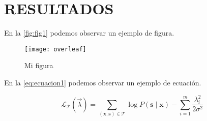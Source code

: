 \chapter{RESULTADOS}

\lipsum[1-1] \parencite{texbook}

En la \autoref{fig:fig1} podemos observar un ejemplo de figura.

\begin{figure}[H]
	\centering
	\texttt{[image: overleaf]}
	\caption{Mi figura}\label{fig:fig1}
\end{figure}

En la \autoref{eq:ecuacion1} podemos observar un ejemplo de ecuación.

\begin{eq}[H]
	\caption{Mi ecuación}\label{eq:ecuacion1}
	\[
		\mathcal L_{\mathcal T}(\vec{\lambda})
		= \sum_{(\mathbf{x},\mathbf{s})\in \mathcal T}
		\log P(\mathbf{s}\mid\mathbf{x}) - \sum_{i=1}^m
		\frac{\lambda_i^2}{2\sigma^2}
	\]
\end{eq}